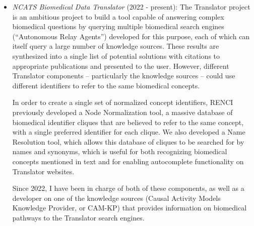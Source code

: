 \begin{itemize}

\item \textit{NCATS Biomedical Data Translator} (2022 - present): The Translator project is an ambitious project to build a tool capable of answering complex biomedical questions by querying multiple biomedical search engines (``Autonomous Relay Agents'') developed for this purpose, each of which can itself query a large number of knowledge sources. These results are synthesized into a single list of potential solutions with citations to appropriate publications and presented to the user. However, different Translator components -- particularly the knowledge sources -- could use different identifiers to refer to the same biomedical concepts.

In order to create a single set of normalized concept identifiers, RENCI previously developed a Node Normalization tool, a massive database of biomedical identifier cliques that are believed to refer to the same concept, with a single preferred identifier for each clique. We also developed a Name Resolution tool, which allows this database of cliques to be searched for by names and synonyms, which is useful for both recognizing biomedical concepts mentioned in text and for enabling autocomplete functionality on Translator websites.

Since 2022, I have been in charge of both of these components, as well as a developer on one of the knowledge sources (Causal Activity Models Knowledge Provider, or CAM-KP) that provides information on biomedical pathways to the Translator search engines.

\begin{products}






\end{products}
\end{itemize}

